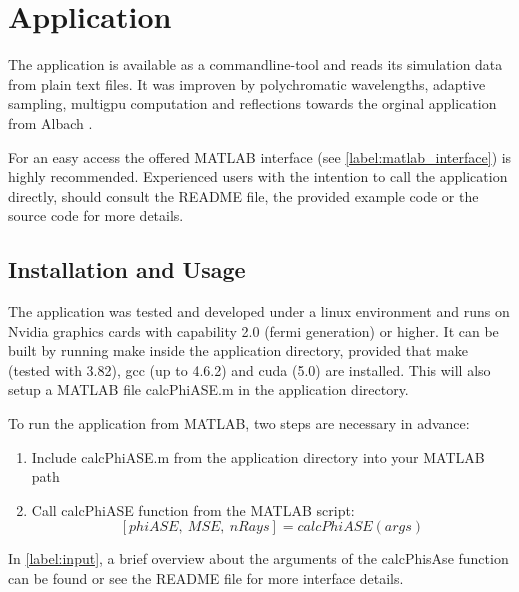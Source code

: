 \section{Application}

The application is available as a commandline-tool and reads
its simulation data from plain text files. It was improven by polychromatic
wavelengths, adaptive sampling, multigpu computation and 
reflections towards the orginal application from Albach \cite{ASE2010}.

For an easy access the offered MATLAB interface (see \ref{label:matlab_interface}) 
is highly recommended. Experienced users with the intention to call the application
directly, should consult the README file, the provided 
example code or the source code for more details.

\subsection{Installation and Usage}
The application was tested and developed under a linux environment
and runs on Nvidia graphics cards with capability 2.0 (fermi generation) or higher.
It can be built by running make inside the application directory, provided
that make (tested with 3.82), gcc (up to 4.6.2) and cuda (5.0) are installed. 
This will also setup a MATLAB file calcPhiASE.m in the application
directory. 

To run the application from MATLAB, two steps are
necessary in advance:
\begin{enumerate}
  \label{label:matlab_interface}
  \item Include calcPhiASE.m from the application directory into your MATLAB path
  \item Call calcPhiASE function from the MATLAB script: \[[phiASE,~MSE,~nRays] = calcPhiASE(args)\]
\end{enumerate}
In \ref{label:input}, a brief overview about the
arguments of the calcPhisAse function can be found 
or see the README file for more interface details.





